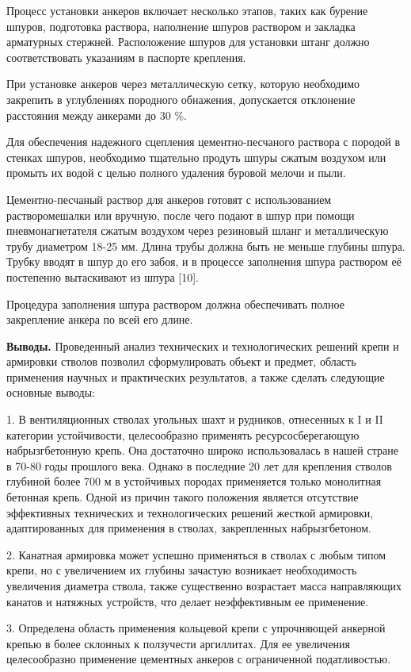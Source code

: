 \begin{multicols}{2}
Процесс установки анкеров включает несколько этапов, таких как бурение
шпуров, подготовка раствора, наполнение шпуров раствором и закладка
арматурных стержней. Расположение шпуров для установки штанг должно
соответствовать указаниям в паспорте крепления.

При установке анкеров через металлическую сетку, которую необходимо
закрепить в углублениях породного обнажения, допускается отклонение
расстояния между анкерами до 30 \%.

Для обеспечения надежного сцепления цементно-песчаного раствора с
породой в стенках шпуров, необходимо тщательно продуть шпуры сжатым
воздухом или промыть их водой с целью полного удаления буровой мелочи и
пыли.

Цементно-песчаный раствор для анкеров готовят с использованием
растворомешалки или вручную, после чего подают в шпур при помощи
пневмонагнетателя сжатым воздухом через резиновый шланг и металлическую
трубу диаметром 18-25 мм. Длина трубы должна быть не меньше глубины
шпура. Трубку вводят в шпур до его забоя, и в процессе заполнения шпура
раствором её постепенно вытаскивают из шпура {[}10{]}.

Процедура заполнения шпура раствором должна обеспечивать полное
закрепление анкера по всей его длине.

{\bfseries Выводы.} Проведенный анализ технических и технологических
решений крепи и армировки стволов позволил сформулировать объект и
предмет, область применения научных и практических результатов, а также
сделать следующие основные выводы:

1. В вентиляционных стволах угольных шахт и рудников, отнесенных к I и
II категории устойчивости, целесообразно применять ресурсосберегающую
набрызгбетонную крепь. Она достаточно широко использовалась в нашей
стране в 70-80 годы прошлого века. Однако в последние 20 лет для
крепления стволов глубиной более 700 м в устойчивых породах применяется
только монолитная бетонная крепь. Одной из причин такого положения
является отсутствие эффективных технических и технологических решений
жесткой армировки, адаптированных для применения в стволах, закрепленных
набрызгбетоном.

2. Канатная армировка может успешно применяться в стволах с любым типом
крепи, но с увеличением их глубины зачастую возникает необходимость
увеличения диаметра ствола, также существенно возрастает масса
направляющих канатов и натяжных устройств, что делает неэффективным ее
применение.

3. Определена область применения кольцевой крепи с упрочняющей анкерной
крепью в более склонных к ползучести аргиллитах. Для ее увеличения
целесообразно применение цементных анкеров с ограниченной податливостью.
\end{multicols}

